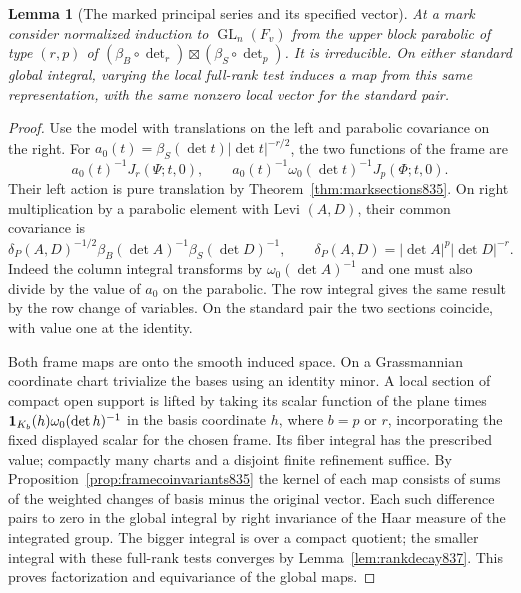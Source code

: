 \documentclass[a4paper,11pt]{article}
\newtheorem{lemma}[proposition]{Lemma}
\theoremstyle{definition}
\theoremstyle{remark}
\numberwithin{equation}{section}
\begin{document}
\begin{lemma}[The marked principal series and its specified vector]
\leavevmode\label{lem:thirdmarkedrep842}
At a mark consider normalized induction to
\(\operatorname{GL}_n(F_v)\) from the upper block parabolic
of type \((r,p)\) of
\((\beta_B\circ\det_r)\boxtimes(\beta_S\circ\det_p)\).
It is irreducible. On either standard global integral, varying
the local full-rank test induces a map from this same
representation, with the same nonzero local vector for the
standard pair.
\end{lemma}
\begin{proof}
Use the model with translations on the left and parabolic
covariance on the right. For \(a_0(t)=\beta_S(\det t)
|\det t|^{-r/2}\), the two functions of the frame are
\[
   a_0(t)^{-1}J_r(\Psi;t,0),\qquad
   a_0(t)^{-1}\omega_0(\det t)^{-1}J_p(\Phi;t,0).
\]
Their left action is pure translation by
Theorem~\ref{thm:marksections835}. On right multiplication
by a parabolic element with Levi \((A,D)\), their common
covariance is
\[
 \delta_P(A,D)^{-1/2}
             \beta_B(\det A)^{-1}\beta_S(\det D)^{-1},
 \qquad \delta_P(A,D)=|\det A|^p|\det D|^{-r}.
\]
Indeed the column integral transforms by
\(\omega_0(\det A)^{-1}\) and one must also divide by the
value of \(a_0\) on the parabolic. The row integral gives
the same result by the row change of variables. On the
standard pair the two sections coincide, with value one at
the identity.

Both frame maps are onto the smooth induced space. On a
Grassmannian coordinate chart trivialize the bases using
an identity minor. A local section of compact open support
is lifted by taking its scalar function of the plane times
\({\bf1}_{K_b}(h)\omega_0(\det h)^{-1}\) in the basis
coordinate \(h\), where \(b=p\) or \(r\), incorporating
the fixed displayed scalar for the chosen frame. Its fiber
integral has the prescribed value; compactly many charts
and a disjoint finite refinement suffice. By
Proposition~\ref{prop:framecoinvariants835} the kernel of
each map consists of sums of the weighted changes of basis
minus the original vector. Each such difference pairs to
zero in the global integral by right invariance of the Haar
measure of the integrated group. The bigger integral is
over a compact quotient; the smaller integral with these
full-rank tests converges by Lemma~\ref{lem:rankdecay837}.
This proves factorization and equivariance of the global maps.


\end{proof}
\end{document}
